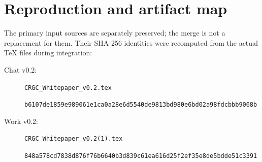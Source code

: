 \documentclass[11pt,letterpaper]{article}
\begin{document}
\section{Reproduction and artifact map}
\label{app:artifacts}
The primary input sources are separately preserved; the merge is not a replacement for them. Their SHA-256 identities were recomputed from the actual TeX files during integration:
\begin{description}
\item[Chat v0.2:] \texttt{CRGC\_Whitepaper\_v0.2.tex}\par\small\texttt{b6107de1859e989061e1ca0a28e6d5540}\newline\texttt{de9813bd980e6bd02a98fdcbbb9068b}\normalsize
\item[Work v0.2:] \texttt{CRGC\_Whitepaper\_v0.2(1).tex}\par\small\texttt{848a578cd7838d876f76b6640b3d839c6}\newline\texttt{1ea616d25f2ef35e8de5bdde51c3391}\normalsize
\end{description}
\end{document}
